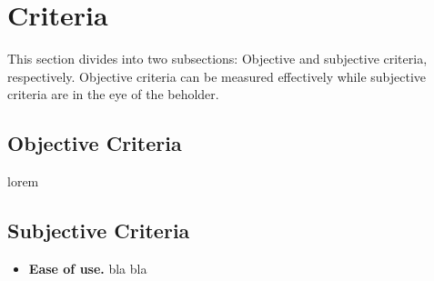 \section{Criteria}

This section divides into two subsections: Objective and subjective criteria, respectively. Objective criteria can be measured effectively while subjective criteria are in the eye of the beholder.

\subsection{Objective Criteria}

lorem

\subsection{Subjective Criteria}

\begin{itemize}
\item \textbf{Ease of use.} bla bla
\end{itemize}
